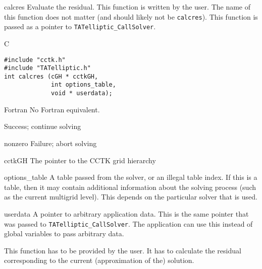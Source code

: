 \begin{FunctionDescription}{calcres}{}
\label{TATelliptic-calcres}
Evaluate the residual.  This function is written by the user.  The
name of this function does not matter (and should likely not be
\texttt{calcres}).  This function is passed as a pointer to
\texttt{TATelliptic\_CallSolver}.

\begin{SynopsisSection}
\begin{Synopsis}{C}
\begin{verbatim}
#include "cctk.h"
#include "TATelliptic.h"
int calcres (cGH * cctkGH,
             int options_table,
             void * userdata);
\end{verbatim}
\end{Synopsis}
\begin{Synopsis}{Fortran}
No Fortran equivalent.
\end{Synopsis}
\end{SynopsisSection}

\begin{ResultSection}
\begin{Result}{0}
Success; continue solving
\end{Result}
\begin{Result}{nonzero}
Failure; abort solving
\end{Result}
\end{ResultSection}

\begin{ParameterSection}
\begin{Parameter}{cctkGH}
The pointer to the CCTK grid hierarchy
\end{Parameter}
\begin{Parameter}{options\_table}
A table passed from the solver, or an illegal table index.  If this is
a table, then it may contain additional information about the solving
process (such as the current multigrid level).  This depends on the
particular solver that is used.
\end{Parameter}
\begin{Parameter}{userdata}
A pointer to arbitrary application data.  This is the same pointer
that was passed to \texttt{TATelliptic\_CallSolver}.  The application
can use this instead of global variables to pass arbitrary data.
\end{Parameter}
\end{ParameterSection}

\begin{Discussion}
This function has to be provided by the user.  It has to calculate the
residual corresponding to the current (approximation of the) solution.


\end{Discussion}
\end{FunctionDescription}
